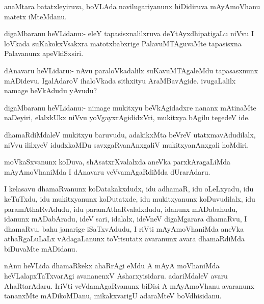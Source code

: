 \documentclass{article}
\begin{document}
\begin{mn}
anaMtara batatxleyiruva, boVLAda navilugariyanunx hiDidiruva
mAyAmoVhanu matetx iMteMdanu.
\end{mn}

\begin{mn}%
digaMbaranu heVLidanu:- eleY tapasisxnalilxruva deYtAyxdhipatigaLu
niVvu I loVkada suKakokxVsakxra matotxbabxrige PalavuMTAguvaMte
tapasisxna Palavanunx apeVkiSxsiri.
\end{mn}

\begin{mn}
dAnavaru heVLidaru:- nAvu paraloVkadalilx suKavuMTAgaleMdu
tapasasxnunx mADidevu. IgalAdaroV ihaloVkada sithxityu
AraMBavAgide. ivugaLalilx namage beVkAdudu yAvudu?
\end{mn}

\begin{mn}
digaMbaranu heVLidanu:- nimage mukitxyu beVkAgidadxre nananx mAtinaMte
naDeyiri, elalxkUkx niVvu yoVgayxrAgididxVri, mukitxya bAgilu tegedeV ide.
\end{mn}

\begin{mn}%
dhamaRdiMdaleV mukitxyu baruvudu, adakikxMta beVreV utatxmavAdudilalx,
niVvu ililxyeV idudxkoMDu savxgaRvanAnxgaliV mukitxyanAnxgali hoMdiri.
\end{mn}

\begin{mn}%
moVkaSxvanunx koDuva, shAsatxrXvalalxda aneVka parxkAragaLiMda
mAyAmoVhaniMda I dAnavaru veVvamAgaRdiMda dUrarAdaru.
\end{mn}

\begin{mn}%
I kelasavu dhamaRvanunx koDatakakxdudx, idu adhamaR, idu oLeLxyadu,
idu keTuTxdu, idu mukitxyanunx koDutatxde, idu mukitxyanunx
koDuvudilalx, idu paramAthaRvAdudu, idu paramAthaRvalalxdudu, idanunx
mADabahudu, idanunx mADabAradu, ideV sari, idalalx, ideVneV
digaMgarara dhamaRvu, I dhamaRvu, bahu janarige iSaTxvAdudu, I riVti
mAyAmoVhaniMda aneVka athaRgaLuLaLx vAdagaLanunx toVrisutatx avaranunx
avara dhamaRdiMda biDuvaMte mADidanu.
\end{mn}

\begin{mn}%
nAnu heVLida dhamaRkekx ahaRrAgi eMdu A mAyA moVhaniMda
heVLalapxTaTxvarAgi avananenxV Asharxyisidaru. adariMdaleV avaru
AhaRtarAdaru. IriVti veVdamAgaRvanunx biDisi A mAyAmoVhanu avaranunx
tananxMte mADikoMDanu, mikakxvarigU adaraMteV boVdhisidanu.
\end{mn}
\end{document}
